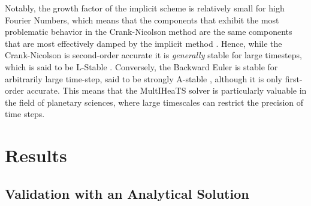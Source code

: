 \documentclass[sn-vancouver, Numbered]{sn-jnl}
\begin{document}
Notably, the growth factor of the implicit scheme is relatively small for high Fourier Numbers, which means that the components that exhibit the most problematic behavior in the Crank-Nicolson method are the same components that are most effectively damped by the implicit method \cite{Oesterby2003}. Hence, while the Crank-Nicolson is second-order accurate it is \textit{generally} stable for large timesteps, which is said to be L-Stable \cite{Press1992}.
 Conversely, the Backward Euler is stable for arbitrarily large time-step, said to be strongly A-stable \cite{Beam1982}, although it is only first-order accurate.
This means that the MultIHeaTS solver is particularly valuable in the field of planetary sciences, where large timescales can restrict the precision of time steps.






\section{Results}
\label{sec:results}
\subsection{Validation with an Analytical Solution}
\end{document}
